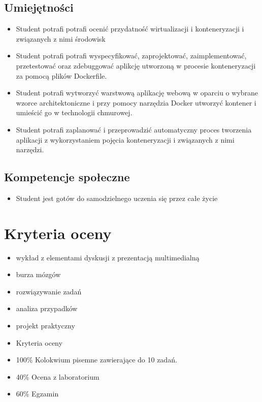 \documentclass[12pt, a4paper]{article}
\begin{document}
\subsection*{Umiejętności}
\begin{itemize}
  \item Student potrafi potrafi ocenić przydatność wirtualizacji i konteneryzacji i związanych z nimi środowisk
  \item Student potrafi potrafi wyspecyfikować, zaprojektować, zaimplementować, przetestować oraz zdebuggować aplikcję utworzoną w procesie konteneryzacji za pomocą plików Dockerfile.
  \item Student potrafi wytworzyć warstwową aplikację webową w oparciu o wybrane wzorce architektoniczne i przy pomocy narzędzia Docker utworzyć kontener i umieścić go w technologii chmurowej.
  \item Student potrafi zaplanować i przeprowadzić automatyczny proces tworzenia aplikacji z wykorzystaniem pojęcia konteneryzacji i związanych z nimi narzędzi.
\end{itemize}

\subsection*{Kompetencje społeczne}
\begin{itemize}
  \item Student jest gotów do samodzielnego uczenia się przez całe życie
\end{itemize}

\section{Kryteria oceny}

\begin{itemize}
  \item wykład z elementami dyskusji z prezentacją multimedialną
  \item burza mózgów
  \item rozwiązywanie zadań
  \item analiza przypadków
  \item projekt praktyczny
  \item Kryteria oceny
  \item 100\% Kolokwium pisemne zawierające do 10 zadań.
  \item 40\% Ocena z laboratorium
  \item 60\% Egzamin
\end{itemize}
\end{document}

